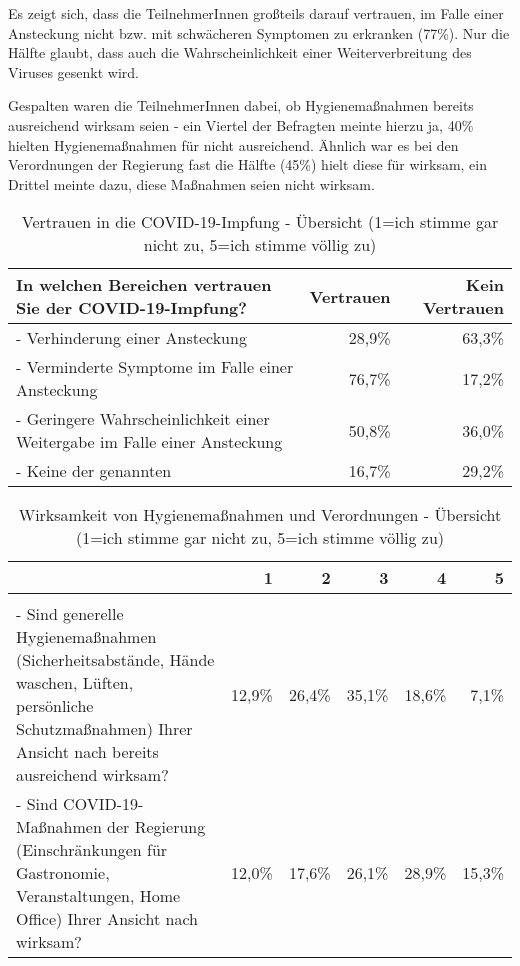 Es zeigt sich, dass die TeilnehmerInnen großteils darauf vertrauen, im Falle einer Ansteckung nicht bzw. mit schwächeren Symptomen zu erkranken (77\%). Nur die Hälfte glaubt, dass auch die Wahrscheinlichkeit einer Weiterverbreitung des Viruses gesenkt wird.

Gespalten waren die TeilnehmerInnen dabei, ob Hygienemaßnahmen bereits ausreichend wirksam seien - ein Viertel der Befragten meinte hierzu ja, 40\% hielten Hygienemaßnahmen für nicht ausreichend. Ähnlich war es bei den Verordnungen der Regierung fast die Hälfte (45\%) hielt diese für wirksam, ein Drittel meinte dazu, diese Maßnahmen seien nicht wirksam.

\begin{table}[h!]
    \centering
    \begin{tabular} {p{9.5cm} r r}
        In welchen Bereichen vertrauen Sie der COVID-19-Impfung? & Vertrauen & Kein Vertrauen \\
        \hline

        - Verhinderung einer Ansteckung & 28,9\% & 63,3\% \\

        - Verminderte Symptome im Falle einer Ansteckung & 76,7\% & 17,2\% \\

        - Geringere Wahrscheinlichkeit einer Weitergabe im Falle einer Ansteckung & 50,8\% & 36,0\% \\

        - Keine der genannten & 16,7\% & 29,2\% \\
    \end{tabular}
    \caption{Vertrauen in die COVID-19-Impfung - Übersicht (1=ich stimme gar nicht zu, 5=ich stimme völlig zu)}
    \label{tab:vertrauen}
\end{table}

\begin{table}[h!]
    \centering
    \begin{tabular} {p{7.5cm} r r r r r}
        & 1 & 2 & 3 & 4 & 5 \\
        \hline
         & & & & & \\

        - Sind generelle Hygienemaßnahmen (Sicherheitsabstände, Hände waschen, Lüften, persönliche Schutzmaßnahmen) Ihrer Ansicht nach bereits ausreichend wirksam?
        & 12,9\% & 26,4\% & 35,1\% & 18,6\% & 7,1\% \\

        - Sind COVID-19-Maßnahmen der Regierung (Einschränkungen für Gastronomie, Veranstaltungen, Home Office) Ihrer Ansicht nach wirksam?
        & 12,0\% & 17,6\% & 26,1\% & 28,9\% & 15,3\% \\
    \end{tabular}
    \caption{Wirksamkeit von Hygienemaßnahmen und Verordnungen - Übersicht (1=ich stimme gar nicht zu, 5=ich stimme völlig zu)}
    \label{tab:vertrauen2}
\end{table}

